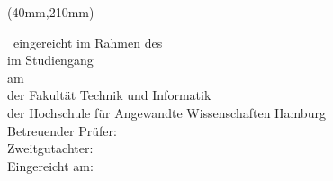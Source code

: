 %
%
\newpage
\thispagestyle{empty}
{\selectfont

  \vspace*{1cm}
  \begin{minipage}[b]{\textwidth}
    \fontsize{14pt}{20pt}
    \selectfont
    \begin{center}
      \IthesisAuthor
    \end{center}
  \end{minipage}

  \vspace{1.5cm}
  \begin{minipage}[b][0cm][b]{\textwidth}
    \fontsize{18pt}{20pt}
    \selectfont
    \begin{center}
      \IthesisTitle  	  
  	\end{center}
  \end{minipage}

  \begin{textblock*}{\textwidth}(40mm,210mm)
    \begin{minipage}[b]{\textwidth}
      \selectfont
      \fontsize{12pt}{14pt}
      \selectfont
      \IthesisKindDE ~eingereicht im Rahmen des \IthesisExaminationDE \\

      im Studiengang \IstudyCourseName \\
      am \IthesisDepartmentFull \\
      der Fakultät Technik und Informatik\\
      der Hochschule für Angewandte Wissenschaften Hamburg\\

      Betreuender Prüfer: \IfirstSv \\
      Zweitgutachter: \IsecondSv \\

      Eingereicht am: \ISubDate \\
    \end{minipage}
  \end{textblock*}
}
